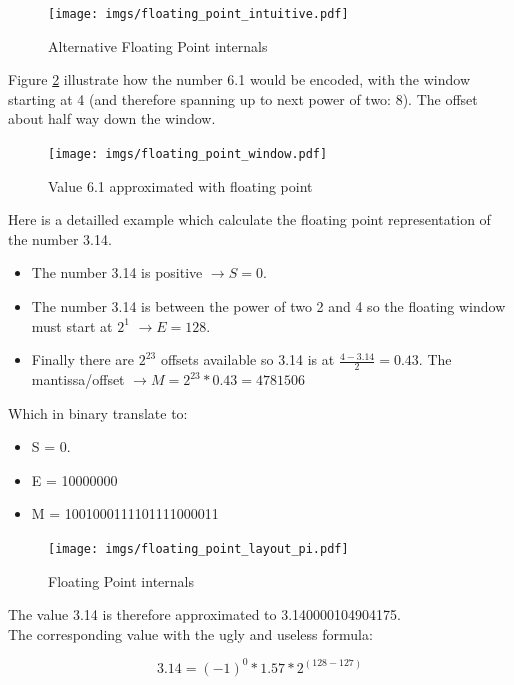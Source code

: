 \documentclass[book.tex]{subfiles}
\begin{document}
\begin{figure}[H]
\centering
\texttt{[image: imgs/floating\_point\_intuitive.pdf]}
\caption{Alternative Floating Point internals}
\label{fig:fp_internals}
\end{figure}
  \bigskip  

Figure \ref{fig:fp_internals_window} illustrate how the number 6.1 would be encoded, with the window starting at 4 (and therefore spanning up to next power of two: 8). The offset about half way down the window.

\begin{figure}[H]
\centering
\texttt{[image: imgs/floating\_point\_window.pdf]}

\caption{Value 6.1 approximated with floating point}
\label{fig:fp_internals_window}
\end{figure}
  \bigskip
  
Here is a detailled example which calculate the floating point representation of the number 3.14.
\begin{itemize}
 \item The number 3.14 is positive  $\rightarrow S=0$.
 \item The number 3.14 is between the power of two 2 and 4 so the floating window must start at $2^1$  $\rightarrow E=128$.
 \item Finally there are $2^{23}$ offsets available so 3.14 is at $\frac{4-3.14}{2} = 0.43 $. The mantissa/offset $\rightarrow M = 2^{23}*0.43 = 4781506$
\end{itemize}

Which in binary translate to:

\begin{itemize}
\item S = 0.
\item E = 10000000
\item M = 1001000111101111000011
\end{itemize}

\begin{figure}[H]
\centering
\texttt{[image: imgs/floating\_point\_layout\_pi.pdf]}
\caption{Floating Point internals}
\label{fig:fp_internals}
\end{figure}
  \bigskip

The value 3.14 is therefore approximated to 3.140000104904175.\\

The corresponding value with the ugly and useless formula:

\begin{equation}
3.14 = (-1)^0 * 1.57 * 2^{(128-127)}
\end{equation}
\end{document}
